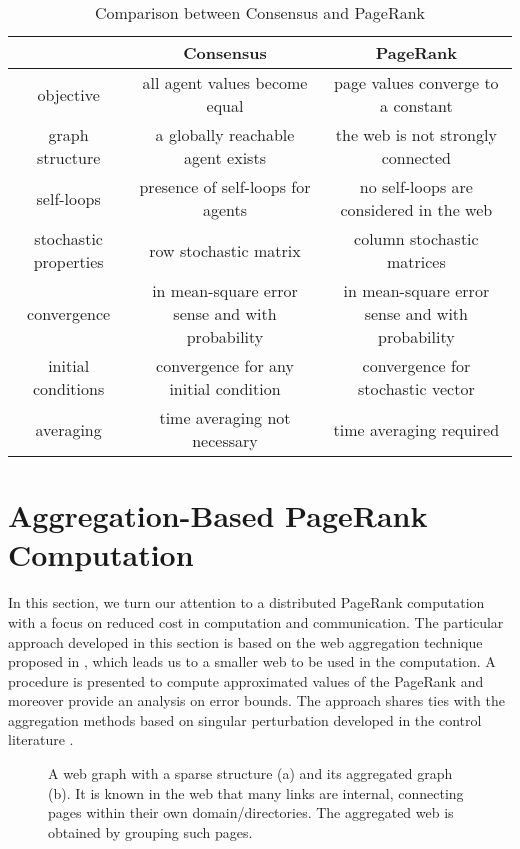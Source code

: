 \documentclass[11pt,draftcls,onecolumn]{IEEEtran}
\begin{document}
\begin{table}[htb]
\caption{Comparison between Consensus and PageRank}
\label{consensusandpagerank}
\begin{tabular}{|c|c|c|} \hline
& Consensus & PageRank \\ \hline
objective & all agent values  become equal & page values  converge to a constant \\
graph structure & a globally reachable agent exists & the web is not strongly connected \\
self-loops & presence of self-loops for agents & no self-loops are considered in the web\\
stochastic properties &row stochastic matrix  & column stochastic matrices \\
convergence & in mean-square error sense and with probability  & in mean-square error sense
and with probability 
\\
initial conditions & convergence for any initial condition   & convergence for stochastic vector \\
averaging & time averaging not necessary & time averaging  required \\
\hline
\end{tabular}
\end{table}


\section*{Aggregation-Based PageRank Computation}

In this section, we turn our attention to a distributed PageRank computation
with a focus on reduced cost in computation and communication.
The particular approach developed in this section 
is based on the web aggregation technique proposed in 
\cite{IshTemBai:12}, which
leads us to a smaller web to be used in the computation. 
A procedure is presented to compute approximated values of the
PageRank and moreover provide an analysis on error bounds.
The approach shares ties with the
aggregation methods based on singular perturbation 
developed in the control literature \cite{PhiKok:81}.

\begin{figure}
  \centering
  \caption{A web graph with a sparse structure (a) and 
   its aggregated graph (b). It is known in the web that many links are internal, connecting pages
   within their own domain/directories. The aggregated web is obtained by grouping such pages.}
  \label{fig:aggregation1}  
\end{figure}
\end{document}
